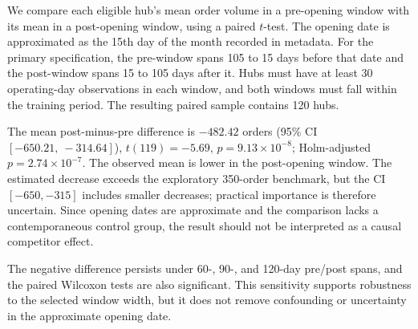 \documentclass[10pt,a4paper,twocolumn]{article}
\begin{document}
We compare each eligible hub's mean order volume in a pre-opening window with its mean in a post-opening window, using a paired $t$-test. The opening date is approximated as the 15th day of the month recorded in metadata. For the primary specification, the pre-window spans 105 to 15 days before that date and the post-window spans 15 to 105 days after it. Hubs must have at least 30 operating-day observations in each window, and both windows must fall within the training period. The resulting paired sample contains 120 hubs.

The mean post-minus-pre difference is $-482.42$ orders (95\% CI $[-650.21,\ -314.64]$), $t(119)=-5.69$, $p=9.13\times10^{-8}$; Holm-adjusted $p=2.74\times10^{-7}$. The observed mean is lower in the post-opening window. The estimated decrease exceeds the exploratory 350-order benchmark, but the CI $[-650,-315]$ includes smaller decreases; practical importance is therefore uncertain. Since opening dates are approximate and the comparison lacks a contemporaneous control group, the result should not be interpreted as a causal competitor effect.

\begin{table}[H]
\centering
\caption{Sensitivity analysis for competitor-opening windows}
\label{tab:sensitivity}
\scriptsize
{}
\end{table}

The negative difference persists under 60-, 90-, and 120-day pre/post spans, and the paired Wilcoxon tests are also significant. This sensitivity supports robustness to the selected window width, but it does not remove confounding or uncertainty in the approximate opening date.
\end{document}
